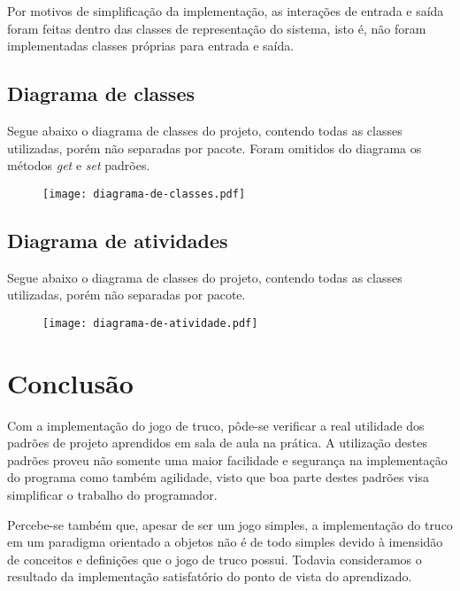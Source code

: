 \documentclass[a4paper,12pt]{article}
\begin{document}
Por motivos de simplificação da implementação, as interações de entrada e saída foram feitas dentro das classes de representação do sistema, isto é, não foram implementadas classes próprias para entrada e saída.

\subsection{Diagrama de classes}
Segue abaixo o diagrama de classes do projeto, contendo todas as classes utilizadas, porém não separadas por pacote. Foram omitidos do diagrama os métodos \emph{get} e \emph{set} padrões.

\begin{figure}[ht]
  \centering
  \texttt{[image: diagrama-de-classes.pdf]}
\end{figure}

\newpage

\subsection{Diagrama de atividades}
Segue abaixo o diagrama de classes do projeto, contendo todas as classes utilizadas, porém não separadas por pacote.

\begin{figure}[!ht]
  \centering
  \texttt{[image: diagrama-de-atividade.pdf]}
\end{figure}

\newpage

\section{Conclusão}

Com a implementação do jogo de truco, pôde-se verificar a real utilidade dos padrões de projeto aprendidos em sala de aula na prática. A utilização destes padrões proveu não somente uma maior facilidade e segurança na implementação do programa como também agilidade, visto que boa parte destes padrões visa simplificar o trabalho do programador.

Percebe-se também que, apesar de ser um jogo simples, a implementação do truco em um paradigma orientado a objetos não é de todo simples devido à imensidão de conceitos e definições que o jogo de truco possui. Todavia consideramos o resultado da implementação satisfatório do ponto de vista do aprendizado.
\end{document}
